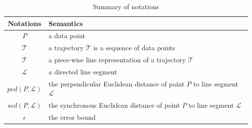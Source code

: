 \begin{table}
	\renewcommand{\arraystretch}{1.20}
	\vspace{-1ex}
	\caption{\small Summary of notations}
	\centering
	\scriptsize
	\begin{tabular}{|c|l|}
		\hline
		{\bf Notations}& {\bf Semantics}   \\		\hline %
		$P$ & a data point \\		\hline
		$\dddot{\mathcal{T}}$ & a trajectory $\dddot{\mathcal{T}}$ is a sequence of data points\\		\hline
		$\overline{\mathcal{T}}$&  {a piece-wise line representation of a trajectory $\dddot{\mathcal{T}}$}	\\		\hline
		$\mathcal{L}$ & a directed line segment  \\		\hline
		$ped\left(P, \mathcal{L}\right)$ &  {the perpendicular Euclidean distance of point $P$ to line segment $\mathcal{L}$}	\\	\hline
		$sed\left(P, \mathcal{L}\right)$ & {the synchronous Euclidean distance of point $P$ to line segment $\mathcal{L}$} 	\\		\hline
		$\epsilon$ & the error bound \\		\hline
	\end{tabular}
	\label{tab:notations}
	\vspace{-1ex}
\end{table}


